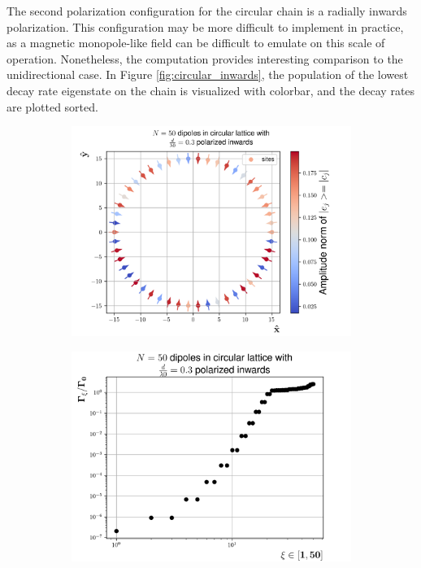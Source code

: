 \documentclass{article}
\begin{document}
\noindent
The second polarization configuration for the circular chain is a radially inwards polarization. This configuration may be more difficult to implement in practice, as a magnetic monopole-like field can be difficult to emulate on this scale of operation. Nonetheless, the computation provides interesting comparison to the unidirectional case. In Figure \ref{fig:circular_inwards}, the population of the lowest decay rate eigenstate on the chain is visualized with colorbar, and the decay rates are plotted sorted. 

\begin{figure}[H]
    \centering
    \begin{subfigure}[b]{0.49\textwidth}
        \includegraphics[width=\textwidth]{figs/dipoles_case_circular_inwards_lowest.png}
        \caption{}
        \label{fig:circular_inwards_lowest_eigenstate}
    \end{subfigure}
    \hfill
    \begin{subfigure}[b]{0.49\textwidth}
        \includegraphics[width=\textwidth]{figs/case_circular_inwards_d_03.png}

\end{subfigure}
\end{figure}
\end{document}
